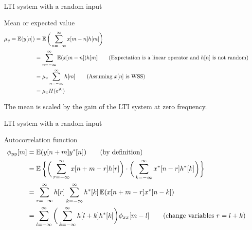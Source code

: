 \documentclass[10pt]{beamer}
\begin{document}
%
\begin{frame}{LTI system with a random input}

\begin{block}{Mean or expected value}
	\begin{align*}
	\mu_y = \operatorname{\mathbb{E}}(y[n]) &= \operatorname{\mathbb{E}}\bigg(\sum_{n=-\infty}^{\infty} x[m-n]h[m]\bigg) \\
	&= \sum_{n=-\infty}^{\infty} \operatorname{\mathbb{E}}(x[m-n])h[m] \tag{Expectation is a linear operator and $h[n]$ is not random} \\
	&= \mu_x\sum_{n=-\infty}^{\infty} h[m] \tag{Assuming $x[n]$ is WSS} \\
	&= \mu_xH(e^{j0})
	\end{align*}
\end{block}

The mean is scaled by the gain of the LTI system at zero frequency.
\end{frame}

\begin{frame}{LTI system with a random input}

\begin{block}{Autocorrelation function}
	\begin{align} \nonumber
	\phi_{yy}[m] &= \operatorname{\mathbb{E}}(y[n+m]y^*[n]) \tag{by definition}  \\ \nonumber
	&= \operatorname{\mathbb{E}}\bigg\lbrace\bigg(\sum_{r=-\infty}^{\infty} x[n+m-r]h[r]\bigg)\cdot\bigg(\sum_{k=-\infty}^{\infty} x^*[n-r]h^*[k]\bigg)\bigg\rbrace  \\ \nonumber
	&= \sum_{r=-\infty}^{\infty} h[r] \sum_{k=-\infty}^{\infty} h^*[k]\operatorname{\mathbb{E}}(x[n+m-r]x^*[n-k]) \\
	&= \sum_{l=-\infty}^{\infty} \bigg(\sum_{k=-\infty}^{\infty} h[l+k]h^*[k]\bigg)\phi_{xx}[m-l] \tag{change variables $r = l+k$}
	\end{align}
\end{block}
\end{frame}
\end{document}
